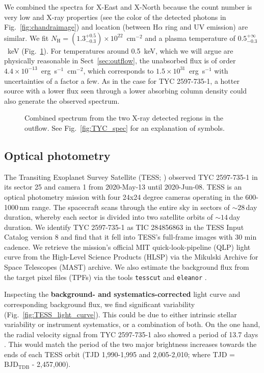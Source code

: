 \documentclass[linenumbers]{aastex631}
\begin{document}
We combined the spectra for X-East and X-North because the count number is very low and X-ray properties (see the color of the detected photons in Fig.~\ref{fig:chandraimage}) and location (between H$\alpha$ ring and UV emission) are similar.
We fit $N_\mathrm{H}=(1.3_{-0.3}^{+0.5})\times10^{22}$~cm$^{-2}$ and a plasma temperature of $0.5_{-0.3}^{+\infty}$~keV (Fig.~\ref{fig:combined}). For temperatures around 0.5~keV, which we will argue are physically reasonable in Sect~\ref{sec:outflow}, the unabsorbed flux is of order $4.4 \times 10^{-13}$~erg~s$^{-1}$~cm$^{-2}$, which corresponds to $1.5\times10^{31}$~erg~s$^{-1}$ with uncertainties of a factor a few. As in the case for TYC 2597-735-1, a hotter source with a lower flux seen through a lower absorbing column density could also generate the observed spectrum.
\begin{figure}
    \caption{Combined spectrum from the two X-ray detected regions in the outflow. See Fig.~\ref{fig:TYC_spec} for an explanation of symbols.
    \label{fig:combined}}
\end{figure}


\subsection{Optical photometry}
\label{sec:TESS}
The Transiting Exoplanet Survey Satellite (TESS; \citealt{Ricker2015}) observed TYC 2597-735-1 in its sector 25 and camera 1 from 2020-May-13 until 2020-Jun-08.
TESS is an optical photometry mission with four 24x24 degree cameras operating in the 600-1000\,nm range. The spacecraft scans through the entire sky in sectors of $\sim28$\,day duration, whereby each sector is divided into two satellite orbits of $\sim14$\,day duration.
We identify TYC 2597-735-1 as TIC 284856863 in the TESS Input Catalog version 8 \citep{Stassun2019} and find that it fell into TESS's full-frame images with 30 min cadence.
We retrieve the mission's official MIT quick-look-pipeline (QLP) light curve from the High-Level Science Products (HLSP) via the Mikulski Archive for Space Telescopes (MAST) archive.
We also estimate the background flux from the target pixel files (TPFs) via the tools \texttt{tesscut} \citep{Brasseur2019} and \texttt{eleanor} \citep{Feinstein2019}.

Inspecting the \textbf{background- and systematics-corrected} light curve and corresponding background flux, we find significant variability (Fig.~\ref{fig:TESS_light_curve}).
This could be due to either intrinsic stellar variability or instrument systematics, or a combination of both.
On the one hand, the radial velocity signal from TYC 2597-735-1 also showed a period of 13.7 days \citep{2020Natur.587..387H}. This would match the period of the two major brightness increases towards the ends of each TESS orbit (TJD 1,990-1,995 and 2,005-2,010; where TJD = $\mathrm{BJD_{TDB}}$ - 2,457,000).
\end{document}
